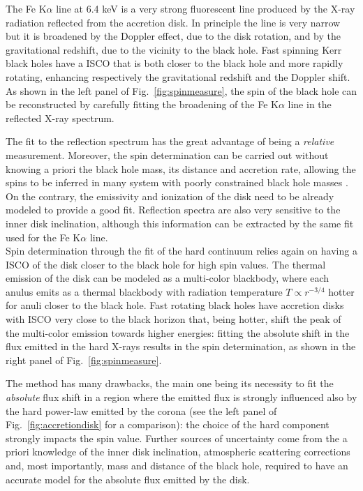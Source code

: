 \documentclass[a4paper,titlepage]{book}     	%
\begin{document}
The Fe K$\alpha$ line at 6.4 keV is a very strong fluorescent line produced by the X-ray radiation reflected from the accretion disk. In principle the line is very narrow but it is broadened by the Doppler effect, due to the disk rotation, and by the gravitational redshift, due to the vicinity to the black hole. Fast spinning Kerr black holes have a ISCO that is both closer to the black hole and more rapidly rotating, enhancing respectively the gravitational redshift and the Doppler shift. As shown in the left panel of Fig.\ \ref{fig:spinmeasure}, the spin of the black hole can be reconstructed by carefully fitting the broadening of the Fe K$\alpha$ line in the reflected X-ray spectrum.

The fit to the reflection spectrum has the great advantage of being a \textit{relative} measurement. Moreover, the spin determination can be carried out without knowing a priori the black hole mass, its distance and accretion rate, allowing the spins to be inferred in many system with poorly constrained black hole masses \cite{HMXBH_spins2021}. On the contrary, the emissivity and ionization of the disk need to be already modeled to provide a good fit. Reflection spectra are also very sensitive to the inner disk inclination, although this information can be extracted by the same fit used for the Fe K$\alpha$ line.\\

Spin determination through the fit of the hard continuum relies again on having a ISCO of the disk closer to the black hole for high spin values. The thermal emission of the disk can be modeled as a multi-color blackbody, where each anulus emits as a thermal blackbody with radiation temperature $T \propto r^{-3/4}$ hotter for anuli closer to the black hole. Fast rotating black holes have accretion disks with ISCO very close to the black horizon that, being hotter, shift the peak of the multi-color emission towards higher energies: fitting the absolute shift in the flux emitted in the hard X-rays results in the spin determination, as shown in the right panel of Fig.\ \ref{fig:spinmeasure}.

The method has many drawbacks, the main one being its necessity to fit the \textit{absolute} flux shift in a region where the emitted flux is strongly influenced also by the hard power-law emitted by the corona (see the left panel of Fig.\ \ref{fig:accretiondisk} for a comparison): the choice of the hard component strongly impacts the spin value. Further sources of uncertainty come from the a priori knowledge of the inner disk inclination, atmospheric scattering corrections and, most importantly, mass and distance of the black hole, required to have an accurate model for the absolute flux emitted by the disk. \cite{Xbinaries_spinBHmeasure}
\end{document}
